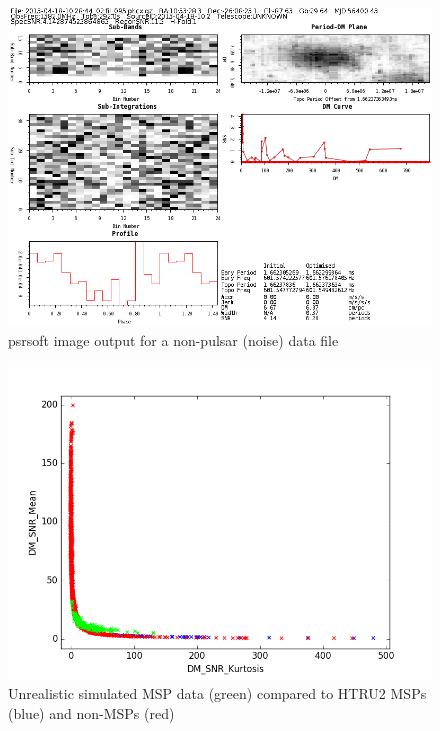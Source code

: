\documentclass[12pt]{article}
\begin{document}
\begin{figure}[h!]
\begin{center}
\includegraphics[scale=0.4]{2013-04-18-10_28_44_02_fil_095.png}
\caption{psrsoft image output for a non-pulsar (noise) data file}
\label{psrsoftnoise}
\end{center}
\end{figure}

\begin{figure}[h!]
\begin{center}
\includegraphics[scale=0.5]{HTRU2_msp(b)_non_msp(r)_sim_r3(g)_dm_mean_vs_skew.png}
\caption{Unrealistic simulated MSP data (green) compared to HTRU2 MSPs (blue) and non-MSPs (red)}
\label{DMMeanSkewBadvsMSPvsNon}
\end{center}
\end{figure}
\end{document}
